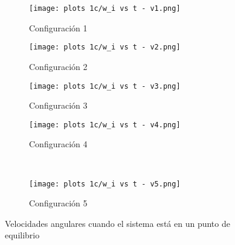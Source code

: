 \documentclass[letterpaper, 12pt]{article}
\begin{document}
\begin{enumerate}
\begin{enumerate}
\begin{figure}[H]
    \centering
    \begin{subfigure}[H]{0.45\linewidth}
        \texttt{[image: plots 1c/w\_i vs t - v1.png]}
        \caption{\centering Configuración 1}
        \label{fig:config 1}
    \end{subfigure}
    \hspace{0.5cm}
    \begin{subfigure}[H]{0.45\linewidth}
        \texttt{[image: plots 1c/w\_i vs t - v2.png]}
        \caption{\centering Configuración 2}
        \label{fig:config 2}
    \end{subfigure}
    \newpage
    \begin{subfigure}[H]{0.45\linewidth}
        \texttt{[image: plots 1c/w\_i vs t - v3.png]}
        \caption{\centering Configuración 3}
        \label{fig:config 3}
    \end{subfigure}
    \hspace{0.5cm}
    \begin{subfigure}[H]{0.45\linewidth}
        \texttt{[image: plots 1c/w\_i vs t - v4.png]}
        \caption{\centering Configuración 4}
        \label{fig:config 4}
    \end{subfigure}
    \\
    \begin{subfigure}[H]{0.45\linewidth}
        \texttt{[image: plots 1c/w\_i vs t - v5.png]}
        \caption{\centering Configuración 5}
        \label{fig:config 5}
    \end{subfigure}
    \caption{Velocidades angulares cuando el sistema está en un punto de equilibrio}
    \label{fig:configuraciones de momentos de inercia}
\end{figure}


\end{enumerate}
\end{enumerate}
\end{document}
